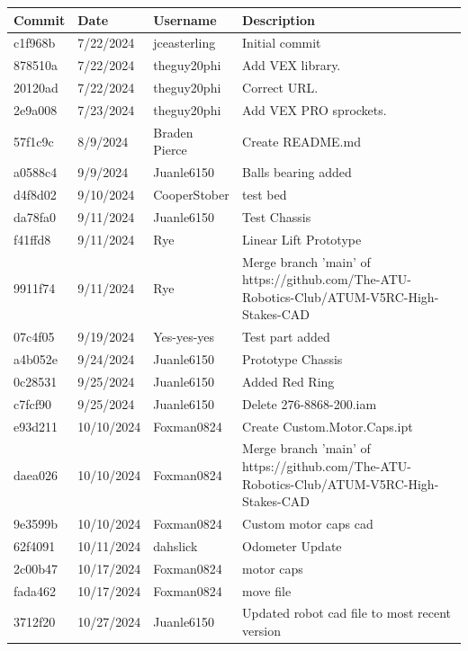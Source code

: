 \begin{center}
\begin{longtable}{|p{28pt}|p{33pt}|p{40pt}|p{300pt}|}
\hline
\textbf{Commit} & \textbf{Date} & \textbf{Username} & \textbf{Description} \\
\hline
c1f968b & 7/22/2024 & jceasterling & Initial commit \\
\hline
878510a & 7/22/2024 & theguy20phi & Add VEX library. \\
\hline
20120ad & 7/22/2024 & theguy20phi & Correct URL. \\
\hline
2e9a008 & 7/23/2024 & theguy20phi & Add VEX PRO sprockets. \\
\hline
57f1c9c & 8/9/2024 & Braden Pierce & Create README.md \\
\hline
a0588c4 & 9/9/2024 & Juanle6150 & Balls bearing added \\
\hline
d4f8d02 & 9/10/2024 & CooperStober & test bed \\
\hline
da78fa0 & 9/11/2024 & Juanle6150 & Test Chassis \\
\hline
f41ffd8 & 9/11/2024 & Rye & Linear Lift Prototype \\
\hline
9911f74 & 9/11/2024 & Rye & Merge branch 'main' of https://github.com/The-ATU-Robotics-Club/ATUM-V5RC-High-Stakes-CAD \\
\hline
07c4f05 & 9/19/2024 & Yes-yes-yes & Test part added \\
\hline
a4b052e & 9/24/2024 & Juanle6150 & Prototype Chassis \\
\hline
0c28531 & 9/25/2024 & Juanle6150 & Added Red Ring \\
\hline
c7fcf90 & 9/25/2024 & Juanle6150 & Delete 276-8868-200.iam \\
\hline
e93d211 & 10/10/2024 & Foxman0824 & Create Custom.Motor.Caps.ipt \\
\hline
daea026 & 10/10/2024 & Foxman0824 & Merge branch 'main' of https://github.com/The-ATU-Robotics-Club/ATUM-V5RC-High-Stakes-CAD \\
\hline
9e3599b & 10/10/2024 & Foxman0824 & Custom motor caps cad \\
\hline
62f4091 & 10/11/2024 & dahslick & Odometer Update \\
\hline
2c00b47 & 10/17/2024 & Foxman0824 & motor caps \\
\hline
fada462 & 10/17/2024 & Foxman0824 & move file \\
\hline
3712f20 & 10/27/2024 & Juanle6150 & Updated robot cad file to most recent version \\
\hline

\end{longtable}
\end{center}
